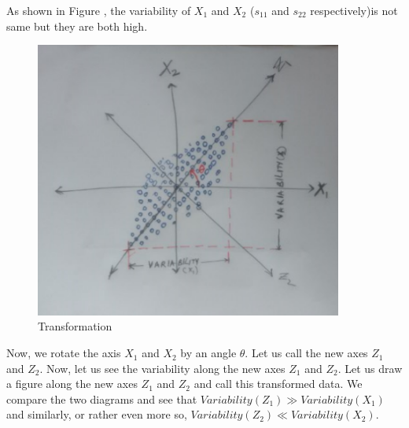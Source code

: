 \documentclass[12pt,a4paper]{report}
\begin{document}
As shown in Figure , the variability of $X_1$ and $X_2$ ($s_{11}$ and $s_{22}$ respectively)is not same but they are both high. \\
\begin{figure}[!ht] \label{FigPCA3}
    \centering
    \includegraphics[width = 0.9\textwidth]{SVM/SVMImages/PCA4.PNG}
    \caption{Transformation}
\end{figure}
Now, we rotate the axis ${X_1}$ and ${X_2}$ by an angle $\theta$. Let us call the new axes $Z_1$ and $Z_2$. Now, let us see the variability along the new axes $Z_1$ and $Z_2$. Let us draw a figure along the new axes $Z_1$ and $Z_2$ and call this transformed data. We compare the two diagrams and see that $Variability(Z_1) \gg Variability (X_1)$ and similarly, or rather even more so,  $Variability(Z_2) \ll Variability (X_2)$.\\
\end{document}

